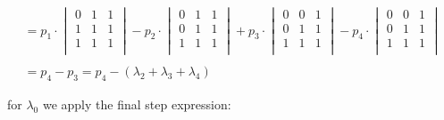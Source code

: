 \begin{}
\begin{equation}
\begin{align*}
				= p_1 \cdot \begin{vmatrix} 0 & 1 & 1 \\ 1 & 1 & 1 \\ 1 & 1 & 1 \\ \end{vmatrix} - 
				p_2 \cdot \begin{vmatrix} 0 & 1 & 1 \\ 0 & 1 & 1 \\ 1 & 1 & 1 \\ \end{vmatrix} + 
				p_3 \cdot \begin{vmatrix} 0 & 0 & 1 \\0 & 1 & 1 \\ 1 & 1 & 1 \\ \end{vmatrix} - 
				p_4 \cdot \begin{vmatrix} 0 & 0 & 1 \\ 0 & 1 & 1 \\ 1 & 1 & 1 \\ \end{vmatrix} \\ \\ 
				
				= p_4 - p_3 = p_4 - (\lambda_2 + \lambda_3 + \lambda_4)
		\end{align*}
		\end{equation}	
		
		
		for $\lambda_0$ we apply the final step expression:
		


\end{}
